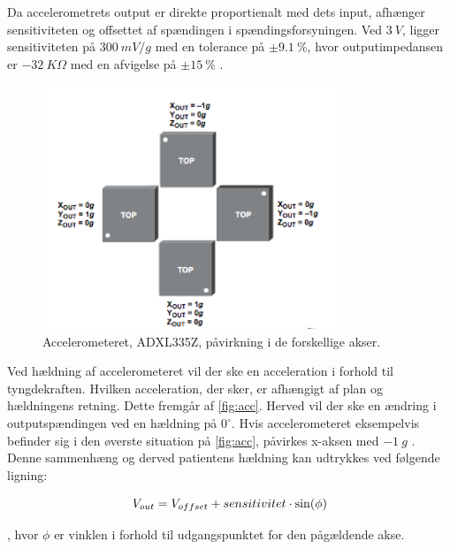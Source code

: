 Da accelerometrets output er direkte proportienalt med dets input, afhænger sensitiviteten og offsettet af spændingen i spændingsforsyningen. Ved $3~V$, ligger sensitiviteten på $300~mV/g$ med en tolerance på $\pm 9.1~\%$, hvor outputimpedansen er $-32~K\Omega$ med en afvigelse på $\pm 15~\%$ \citep{analogdevices2010}. 

\begin{figure}[H]
\centering
\includegraphics[width=0.8\textwidth]{figures/acc.png}
\caption{Accelerometeret, ADXL335Z, påvirkning i de forskellige akser.}
\label{fig:acc}
\end{figure}

\noindent
Ved hældning af accelerometeret vil der ske en acceleration i forhold til tyngdekraften. Hvilken acceleration, der sker, er afhængigt af plan og hældningens retning. Dette fremgår af \autoref{fig:acc}. Herved vil der ske en ændring i outputspændingen ved en hældning på $0^{\circ}$. Hvis accelerometeret eksempelvis befinder sig i den øverste situation på \autoref{fig:acc}, påvirkes x-aksen med $-1~g$ \citep{clifford2005}. Denne sammenhæng og derved patientens hældning kan udtrykkes ved følgende ligning: 

\begin{equation} \label{equ:vinkler}
	V_{out} = V_{offset} + sensitivitet \cdot \sin(\phi) \\
\end{equation}

\noindent
, hvor $\phi$ er vinklen i forhold til udgangspunktet for den pågældende akse\citep{clifford2005}.